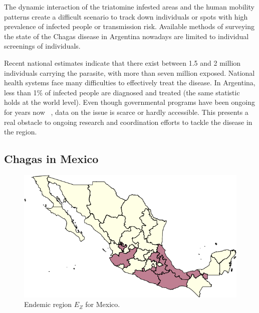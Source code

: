 The dynamic interaction of the triatomine infested areas and the human mobility patterns create a difficult scenario to track down individuals or spots with high prevalence of infected people or transmission risk. Available methods of surveying the state of the Chagas disease in Argentina nowadays are limited to individual screenings of individuals. %

Recent national estimates indicate that there exist between 1.5 and 2 million individuals carrying the parasite, with more than seven million exposed. National health systems face many difficulties to effectively treat the disease. 
In Argentina, less than 1\% of infected people are diagnosed and treated 
(the same statistic holds at the world level).
Even though governmental programs have been ongoing for years now~ \textcite{plan_nacional_chagas}, data on the issue is scarce or hardly accessible. This presents a real obstacle to ongoing research and coordination efforts to tackle the disease in the region.


\subsection{Chagas in  Mexico} \label{endemic_zone_mexico}


\begin{figure}[h!]
\centering
\includegraphics[width=0.75\linewidth]
{figures/Ambientes_Gran_Chaco-Mexico1/Ambientes_Gran_Chaco-Mexico1.png}
\caption{Endemic region $E_Z$ for Mexico.}
\label{fig:endemic_zone_mexico}
\end{figure}

